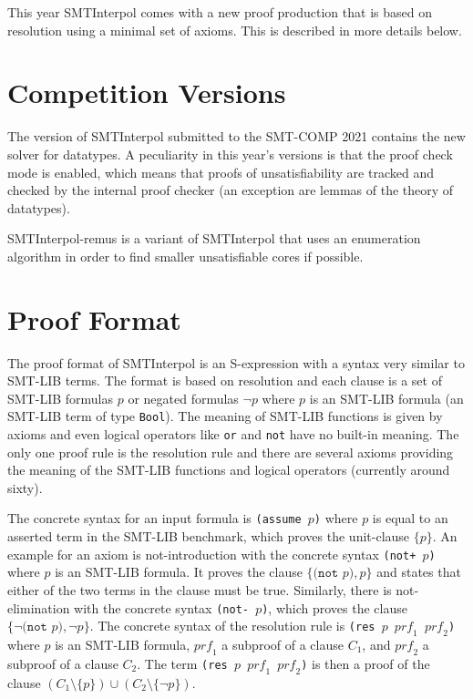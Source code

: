 \documentclass[a4paper]{easychair}
\newcommand\SI{SMTInterpol\xspace}
\newcommand\SIrem{SMTInterpol-remus\xspace}
\newcommand\smtlib[1]{\texttt{#1}}
\newcommand\prf{\mathit{prf}}
\begin{document}
This year \SI comes with a new proof production that is based on resolution using a minimal set of axioms.  This is described in more details below.

\section*{Competition Versions}
The version of \SI submitted to the SMT-COMP 2021 contains the new solver for datatypes.
A peculiarity in this year's versions is that the proof check mode is enabled, which means that proofs of unsatisfiability are tracked and checked by the internal proof checker (an exception are lemmas of the theory of datatypes).

\SIrem is a variant of \SI that uses an enumeration algorithm in order to find smaller unsatisfiable cores if possible.

\section*{Proof Format}

The proof format of \SI is an S-expression with a syntax very similar to SMT-LIB terms.
The format is based on resolution and each clause is a set of SMT-LIB formulas $p$ or negated formulas $\lnot p$ where $p$ is an SMT-LIB formula (an SMT-LIB term of type \smtlib{Bool}).
The meaning of SMT-LIB functions is given by axioms and even logical operators like \smtlib{or} and \smtlib{not} have no built-in meaning.
The only one proof rule is the resolution rule and there are several axioms providing the meaning of the SMT-LIB functions and logical operators (currently around sixty).

The concrete syntax for an input formula is \smtlib{(assume $p$)} where $p$ is equal to an asserted term in the SMT-LIB benchmark, which proves the unit-clause $\{ p \}$.
An example for an axiom is not-introduction with the concrete syntax \smtlib{(not+ $p$)} where $p$ is an SMT-LIB formula.
It proves the clause $\{ \smtlib{(not $p$)}, p \}$ and states that either of the two terms in the clause must be true.
Similarly, there is not-elimination with the concrete syntax \smtlib{(not- $p$)}, which proves the clause $\{ \lnot \smtlib{(not $p$)}, \lnot \smtlib{$p$}\}$.
The concrete syntax of the resolution rule is \smtlib{(res $p$ $\prf_1$ $\prf_2$)} where $p$ is an SMT-LIB formula, $\prf_1$ a subproof of a clause $C_1$, and $\prf_2$ a subproof of a clause $C_2$.
The term \smtlib{(res $p$ $\prf_1$ $\prf_2$)} is then a proof of the clause $(C_1\setminus\{p\}) \cup (C_2\setminus\{\lnot p\})$.
\end{document}

